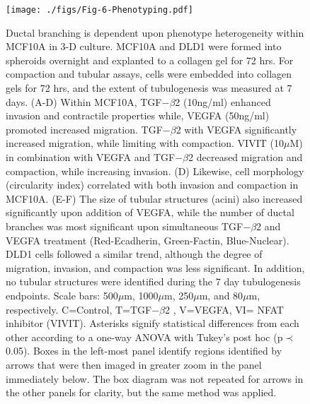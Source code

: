\documentclass[11pt,letterpaper]{article}
\begin{document}
\clearpage

\begin{figure}
\texttt{[image: ./figs/Fig-6-Phenotyping.pdf]}
\caption{Ductal branching is dependent upon phenotype heterogeneity within MCF10A in 3-D culture.  MCF10A and DLD1 were formed into spheroids overnight and explanted to a collagen gel for 72 hrs.  For compaction and tubular assays, cells were embedded into collagen gels for 72 hrs, and the extent of tubulogenesis was measured at 7 days.  (A-D) Within MCF10A, TGF$-\beta$2 (10ng/ml) enhanced invasion and contractile properties while, VEGFA (50ng/ml) promoted increased migration.  TGF$-\beta$2 with VEGFA significantly increased migration, while limiting with compaction.  VIVIT (10$\mu$M) in combination with VEGFA and TGF$-\beta$2 decreased migration and compaction, while increasing invasion.  (D) Likewise, cell morphology (circularity index) correlated with both invasion and compaction in MCF10A.  (E-F) The size of tubular structures (acini) also increased significantly upon addition of VEGFA, while the number of ductal branches was most significant upon simultaneous TGF$-\beta$2 and VEGFA treatment (Red-Ecadherin, Green-Factin, Blue-Nuclear).   DLD1 cells followed a similar trend, although the degree of migration, invasion, and compaction was less significant.  In addition, no tubular structures were identified during the 7 day tubulogenesis endpoints.  Scale bars: 500$\mu$m, 1000$\mu$m, 250$\mu$m, and 80$\mu$m, respectively.  C=Control, T=TGF$-\beta$2 , V=VEGFA, VI= NFAT inhibitor (VIVIT).  Asterisks signify statistical differences from each other according to a one-way ANOVA with Tukey's post hoc (p$\prec$0.05).
Boxes in the left-most panel identify regions identified by arrows that were then imaged in greater zoom in the panel immediately below.
The box diagram was not repeated for arrows in the other panels for clarity, but the same method was applied.}\label{fg:F6}
\end{figure}

\clearpage

\renewcommand\thefigure{S\arabic{figure}}
\renewcommand\thetable{T\arabic{table}}
\renewcommand\thepage{S-\arabic{page}}
\renewcommand\theequation{S\arabic{equation}}

\setcounter{equation}{0}
\setcounter{table}{0}
\setcounter{figure}{0}
\setcounter{page}{1}

\clearpage

\end{document}

